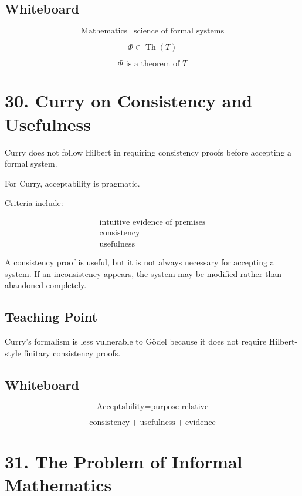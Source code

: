 \documentclass[11pt]{article}
\begin{document}
\subsection*{Whiteboard}

\[
\text{Mathematics}
=
\text{science of formal systems}
\]

\[
\Phi \in \operatorname{Th}(T)
\]

\[
\Phi \text{ is a theorem of }T
\]

\section*{30. Curry on Consistency and Usefulness}

Curry does not follow Hilbert in requiring consistency proofs before accepting a formal
system.

For Curry, acceptability is pragmatic.

Criteria include:

\[
\begin{array}{c}
\text{intuitive evidence of premises} \\
\text{consistency} \\
\text{usefulness}
\end{array}
\]

A consistency proof is useful, but it is not always necessary for accepting a system. If an
inconsistency appears, the system may be modified rather than abandoned completely.

\subsection*{Teaching Point}

Curry's formalism is less vulnerable to G\"odel because it does not require Hilbert-style
finitary consistency proofs.

\subsection*{Whiteboard}

\[
\text{Acceptability}
=
\text{purpose-relative}
\]

\[
\text{consistency}
+
\text{usefulness}
+
\text{evidence}
\]

\section*{31. The Problem of Informal Mathematics}
\end{document}
